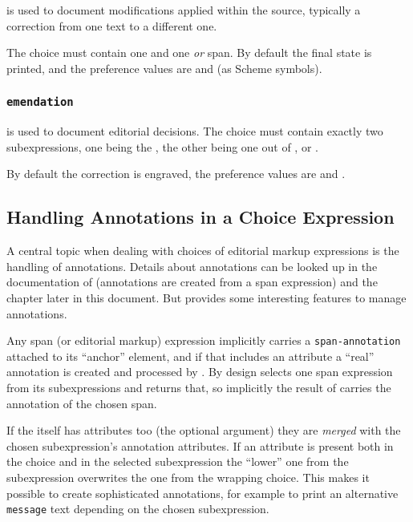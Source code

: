 \documentclass[]{ollmanual}
\begin{document}
 is used to document modifications applied
within the source, typically a correction from one text to a different
one.

The choice must contain one  and one 
\emph{or}  span. By default the final state is
printed, and the preference values are  and  (as
Scheme symbols).

\hypertarget{emendation}{%
\subsubsection{\texorpdfstring{\texttt{emendation}}{emendation}}\label{emendation}}

 is used to document editorial decisions. The
choice must contain exactly two subexpressions, one being the
, the other being one out of ,
 or .

By default the correction is engraved, the preference values are
 and .

\hypertarget{handling-annotations-in-a-choice-expression}{%
\subsection{Handling Annotations in a Choice
Expression}\label{handling-annotations-in-a-choice-expression}}

A central topic when dealing with choices of editorial markup
expressions is the handling of annotations. Details about annotations
can be looked up in the documentation of 
(annotations are created from a span expression) and the
 chapter later in this document. But
 provides some interesting features to manage annotations.

Any span (or editorial markup) expression implicitly carries a
\texttt{span-annotation} attached to its ``anchor'' element, and if that
includes an  attribute a ``real'' annotation is created
and processed by . By design 
selects one span expression from its subexpressions and returns that, so
implicitly the result of  carries the annotation of the
chosen span.

If the  itself has attributes too (the optional argument)
they are \emph{merged} with the chosen subexpression's annotation
attributes. If an attribute is present both in the choice and in the
selected subexpression the ``lower'' one from the subexpression
overwrites the one from the wrapping choice. This makes it possible to
create sophisticated annotations, for example to print an alternative
\texttt{message} text depending on the chosen subexpression.
\end{document}
